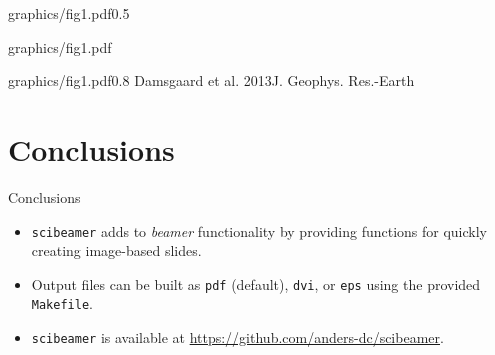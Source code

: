 \documentclass[11pt]{beamer}
\begin{document}
{graphics/fig1.pdf}{0.5}

{graphics/fig1.pdf}

{graphics/fig1.pdf}{0.8}%
{Damsgaard et al. 2013}{J. Geophys. Res.-Earth}


\section{Conclusions}
\begin{frame}{Conclusions}
    \begin{itemize}

        \item \texttt{scibeamer} adds to \emph{beamer} functionality by 
            providing functions for quickly creating image-based slides.\\[3mm]

        \item Output files can be built as \texttt{pdf} (default), \texttt{dvi}, 
            or \texttt{eps} using the provided \texttt{Makefile}.\\[3mm]

        \item \texttt{scibeamer} is available at 
            \url{https://github.com/anders-dc/scibeamer}.

    \end{itemize}
\end{frame}



\end{document}
